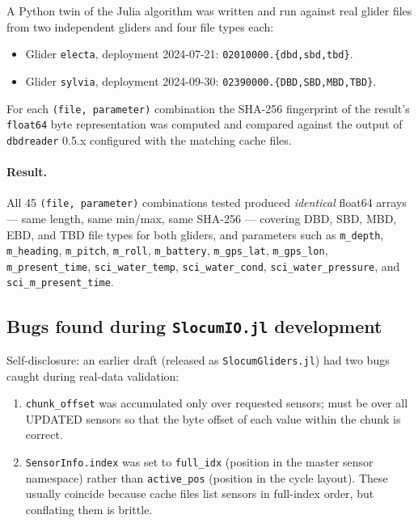 \documentclass[11pt]{article}
\begin{document}
A Python twin of the Julia algorithm was written and run against real
glider files from two independent gliders and four file types each:

\begin{itemize}[leftmargin=*,topsep=1pt,itemsep=0pt]
  \item Glider \texttt{electa}, deployment 2024-07-21:
        \texttt{02010000.\{dbd,sbd,tbd\}}.
  \item Glider \texttt{sylvia}, deployment 2024-09-30:
        \texttt{02390000.\{DBD,SBD,MBD,TBD\}}.
\end{itemize}

For each \texttt{(file, parameter)} combination the SHA-256 fingerprint of
the result's \texttt{float64} byte representation was computed and compared
against the output of \texttt{dbdreader} 0.5.x configured with the matching
cache files.

\paragraph{Result.}
All 45 \texttt{(file, parameter)} combinations tested produced
\emph{identical} float64 arrays — same length, same min/max, same SHA-256
— covering DBD, SBD, MBD, EBD, and TBD file types for both gliders, and
parameters such as \texttt{m\_depth}, \texttt{m\_heading},
\texttt{m\_pitch}, \texttt{m\_roll}, \texttt{m\_battery},
\texttt{m\_gps\_lat}, \texttt{m\_gps\_lon}, \texttt{m\_present\_time},
\texttt{sci\_water\_temp}, \texttt{sci\_water\_cond},
\texttt{sci\_water\_pressure}, and \texttt{sci\_m\_present\_time}.

\subsection{Bugs found during \texttt{SlocumIO.jl} development}

Self-disclosure: an earlier draft (released as \texttt{SlocumGliders.jl})
had two bugs caught during real-data validation:

\begin{enumerate}[leftmargin=*,topsep=1pt,itemsep=0pt]
  \item \texttt{chunk\_offset} was accumulated only over requested sensors;
    must be over all UPDATED sensors so that the byte offset of each value
    within the chunk is correct.
  \item \texttt{SensorInfo.index} was set to \texttt{full\_idx} (position in
    the master sensor namespace) rather than \texttt{active\_pos} (position
    in the cycle layout).  These usually coincide because cache files list
    sensors in full-index order, but conflating them is brittle.
\end{enumerate}
\end{document}
